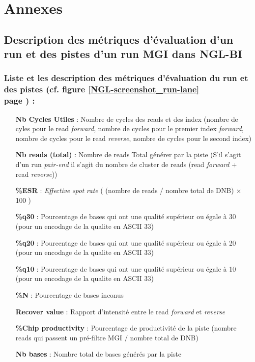 \section{Annexes}
\subsection*{Description des métriques d'évaluation d'un run et des pistes d'un run MGI dans NGL-BI}
\label{anexes1}
\subsubsection*{Liste et les description des métriques d'évaluation du run et des pistes (cf. figure \ref{NGL-screenshot_run-lane} \\page \pageref{NGL-screenshot_run-lane}) :}
\begin{itemize}
    \item[\textbf{Nb Cycles Utiles} :] Nombre de cycles des reads et des index (nombre de cyles pour le read \emph{forward}, nombre de cycles pour le premier index  \emph{forward}, nombre de cycles pour le read \emph{reverse}, nombre de cycles pour le second index)
    \item[\textbf{Nb reads (total)} :] Nombre de reads Total générer par la piste (S'il s'agit d'un run \emph{pair-end} il s'agit du nombre de cluster de reads (read \emph{forward} + read \emph{reverse}))
    \item[\textbf{\%ESR} :] \emph{Effective spot rate} ( (nombre de reads / nombre total de DNB) $\times$ 100 )
    \item[\textbf{\%q30} :] Pourcentage de bases qui ont une qualité supérieur ou égale à 30 (pour un encodage de la qualite en ASCII 33)
    \item[\textbf{\%q20} :] Pourcentage de bases qui ont une qualité supérieur ou égale à 20 (pour un encodage de la qualite en ASCII 33)
    \item[\textbf{\%q10} :] Pourcentage de bases qui ont une qualité supérieur ou égale à 10 (pour un encodage de la qualite en ASCII 33)
    \item[\textbf{\%N} :] Pourcentage de bases inconus
    \item[\textbf{Recover value} :] Rapport d'intensité entre le read \emph{forward} et \emph{reverse}
    \item[\textbf{\%Chip productivity} :] Pourcentage de productivité de la piste (nombre reads qui passent un pré-filtre MGI / nombre total de DNB)
    \item[\textbf{Nb bases} :] Nombre total de bases générés par la piste

\end{itemize}

